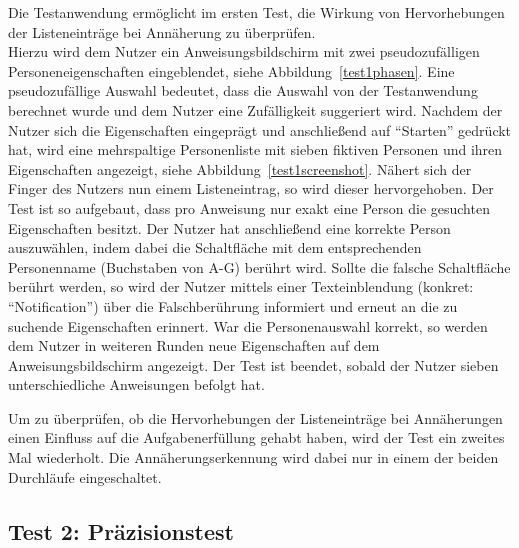 \documentclass[12pt,numbers=noenddot,parskip,bibliography=totocnumbered,listof=totocnumbered]{scrreprt}
\begin{document}
Die Testanwendung ermöglicht im ersten Test, die Wirkung von Hervorhebungen der Listeneinträge bei Annäherung zu überprüfen.\\
Hierzu wird dem Nutzer ein Anweisungsbildschirm mit zwei pseudozufälligen Personeneigenschaften eingeblendet, siehe Abbildung~\ref{test1phasen}. Eine pseudozufällige Auswahl bedeutet, dass die Auswahl von der Testanwendung berechnet wurde und dem Nutzer eine Zufälligkeit suggeriert wird. Nachdem der Nutzer sich die Eigenschaften eingeprägt und anschließend auf "`Starten"' gedrückt hat, wird eine mehrspaltige Personenliste mit sieben fiktiven Personen und ihren Eigenschaften angezeigt, siehe Abbildung~\ref{test1screenshot}. Nähert sich der Finger des Nutzers nun einem Listeneintrag, so wird dieser hervorgehoben. Der Test ist so aufgebaut, dass pro Anweisung nur exakt eine Person die gesuchten Eigenschaften besitzt. Der Nutzer hat anschließend eine korrekte Person auszuwählen, indem dabei die Schaltfläche mit dem entsprechenden Personenname (Buchstaben von A-G) berührt wird. Sollte die falsche Schaltfläche berührt werden, so wird der Nutzer mittels einer Texteinblendung (konkret: "`Notification"') über die Falschberührung informiert und erneut an die zu suchende Eigenschaften erinnert. War die Personenauswahl korrekt, so werden dem Nutzer in weiteren Runden neue Eigenschaften auf dem Anweisungsbildschirm angezeigt. Der Test ist beendet, sobald der Nutzer sieben unterschiedliche Anweisungen befolgt hat.

Um zu überprüfen, ob die Hervorhebungen der Listeneinträge bei Annäherungen einen Einfluss auf die Aufgabenerfüllung gehabt haben, wird der Test ein zweites Mal wiederholt. Die Annäherungserkennung wird dabei nur in einem der beiden Durchläufe eingeschaltet.

\subsection{Test 2: Präzisionstest}
\end{document}
